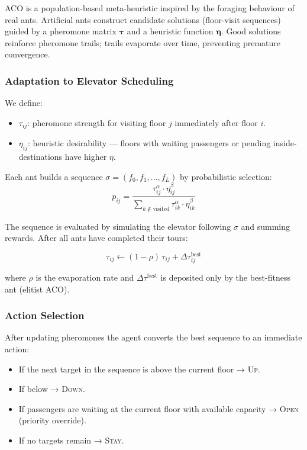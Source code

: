 \documentclass[12pt,a4paper]{article}
\begin{document}
ACO \cite{dorigo1996} is a population-based meta-heuristic inspired by the foraging
behaviour of real ants.  Artificial ants construct candidate solutions
(floor-visit sequences) guided by a pheromone matrix $\boldsymbol{\tau}$ and
a heuristic function $\boldsymbol{\eta}$.  Good solutions reinforce pheromone
trails; trails evaporate over time, preventing premature convergence.

\subsubsection{Adaptation to Elevator Scheduling}

We define:
\begin{itemize}[leftmargin=2em]
    \item $\tau_{ij}$: pheromone strength for visiting floor $j$ immediately after
          floor $i$.
    \item $\eta_{ij}$: heuristic desirability — floors with waiting passengers or
          pending inside-destinations have higher $\eta$.
\end{itemize}

Each ant builds a sequence $\sigma = (f_0, f_1, \ldots, f_L)$ by probabilistic
selection:
\[
p_{ij} = \frac{\tau_{ij}^\alpha \cdot \eta_{ij}^\beta}
              {\sum_{k \notin \text{visited}} \tau_{ik}^\alpha \cdot \eta_{ik}^\beta}
\]

The sequence is evaluated by simulating the elevator following $\sigma$ and summing
rewards.  After all ants have completed their tours:

\[
\tau_{ij} \leftarrow (1-\rho)\,\tau_{ij} + \Delta\tau_{ij}^{\text{best}}
\]

where $\rho$ is the evaporation rate and $\Delta\tau^{\text{best}}$ is deposited
only by the best-fitness ant (elitist ACO).

\subsubsection{Action Selection}

After updating pheromones the agent converts the best sequence to an immediate
action:
\begin{itemize}[leftmargin=2em]
    \item If the next target in the sequence is above the current floor → \textsc{Up}.
    \item If below → \textsc{Down}.
    \item If passengers are waiting at the current floor with available capacity →
          \textsc{Open} (priority override).
    \item If no targets remain → \textsc{Stay}.
\end{itemize}
\end{document}
